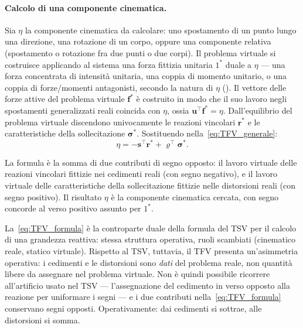 \paragraph{Calcolo di una componente cinematica.}
Sia $\eta$ la componente cinematica da calcolare: uno
spostamento di un punto lungo una direzione, una rotazione
di un corpo, oppure una componente relativa (spostamento
o rotazione fra due punti o due corpi). Il problema
virtuale si costruisce applicando al sistema una forza
fittizia unitaria $1^*$ duale a $\eta$ --- una forza
concentrata di intensità unitaria, una coppia di momento
unitario, o una coppia di forze/momenti antagonisti,
secondo la natura di $\eta$ (). Il vettore
delle forze attive del problema virtuale $\bm{f}^*$ è
costruito in modo che il suo lavoro negli spostamenti
generalizzati reali coincida con $\eta$, ossia
$\bm{u}^\top\bm{f}^* = \eta$. Dall'equilibrio del problema
virtuale discendono univocamente le reazioni vincolari
$\bm{r}^*$ e le caratteristiche della sollecitazione
$\bm{\sigma}^*$. Sostituendo nella~\eqref{eq:TFV_generale}:
\begin{equation}\label{eq:TFV_formula}
	\boxed{\,\eta = -\bm{s}^\top\bm{r}^* +
		\bm{\varrho}^\top\bm{\sigma}^*.\,}
\end{equation}

La formula è la somma di due contributi di segno opposto:
il lavoro virtuale delle reazioni vincolari fittizie nei
cedimenti reali (con segno negativo), e il lavoro virtuale
delle caratteristiche della sollecitazione fittizie nelle
distorsioni reali (con segno positivo). Il risultato
$\eta$ è la componente cinematica cercata, con segno
concorde al verso positivo assunto per $1^*$.


\begin{oss}
	La~\eqref{eq:TFV_formula} è la controparte duale della
	formula del TSV per il calcolo di una grandezza reattiva:
	stessa struttura operativa, ruoli scambiati (cinematico
	reale, statico virtuale). Rispetto al TSV, tuttavia, il
	TFV presenta un'asimmetria operativa: i cedimenti e le
	distorsioni sono \emph{dati} del problema reale, non
	quantità libere da assegnare nel problema virtuale. Non
	è quindi possibile ricorrere all'artificio usato nel TSV
	--- l'assegnazione del cedimento in verso opposto alla
	reazione per uniformare i segni --- e i due contributi
	nella~\eqref{eq:TFV_formula} conservano segni opposti.
	Operativamente: dai cedimenti si sottrae, alle
	distorsioni si somma.
\end{oss}


